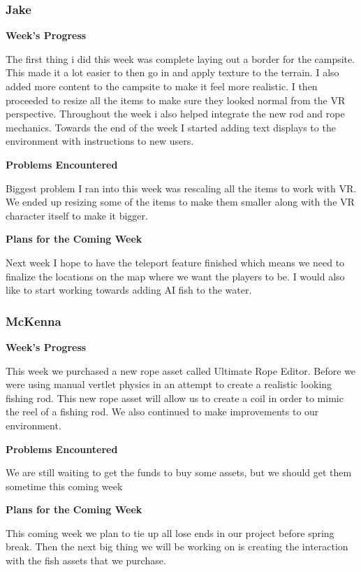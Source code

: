 \documentclass[10pt,journal,compsoc,onecolumn, draftclsnofoot]{IEEEtran}
\begin{document}
\subsubsection{Jake}
\noindent \textbf{Week's Progress}

The first thing i did this week was complete laying out a border for the campsite. This made it a lot easier to then go in and apply texture to the terrain. I also added more content to the campsite to make it feel more realistic. I then proceeded to resize all the items to make sure they looked normal from the VR perspective. Throughout the week i also helped integrate the new rod and rope mechanics. Towards the end of the week I started adding text displays to the environment with instructions to new users.

\noindent \textbf{Problems Encountered}

Biggest problem I ran into this week was rescaling all the items to work with VR. We ended up resizing some of the items to make them smaller along with the VR character itself to make it bigger.

\noindent \textbf{Plans for the Coming Week}

Next week I hope to have the teleport feature finished which means we need to finalize the locations on the map where we want the players to be. I would also like to start working towards adding AI fish to the water.

\subsubsection{McKenna}
\noindent \textbf{Week's Progress}

This week we purchased a new rope asset called Ultimate Rope Editor. Before we were using manual vertlet physics in an attempt to create a realistic looking fishing rod. This new rope asset will allow us to create a coil in order to mimic the reel of a fishing rod. We also continued to make improvements to our environment.

\noindent \textbf{Problems Encountered}

We are still waiting to get the funds to buy some assets, but we should get them sometime this coming week

\noindent \textbf{Plans for the Coming Week}

This coming week we plan to tie up all lose ends in our project before spring break. Then the next big thing we will be working on is creating the interaction with the fish assets that we purchase.
\end{document}
